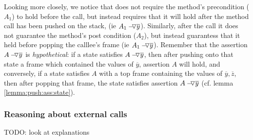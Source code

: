 {

{Looking more closely, we notice  that {} does not require the method's precondition ($A_1$) to hold before the call, but instead requires that it will hold after the method call has been pushed on the stack, (ie $  \PushAS {y}{A_1}$).
Similarly, after the call it does not guarantee the method's post condition ($A_2$), but instead guarantess that it held before popping the calllee's frame (ie $  \PushAS {y}{A_1}$).
Remember that the assertion $\PushAS y A$ is \emph{hypothetical}: if a state satisfies $\PushAS y A$, then after pushing
onto that state a frame which contained the values  of $\overline y$, assertion $A$ will hold, and conversely,   if a state satisfies  $A$ with a top frame containing the  values of $\overline y, \overline z$, then  after popping that frame, the state  satisfies assertion  $\PushAS y A$ (cf.  lemma \ref{lemma:push:ass:state}).




\subsubsection{Reasoning about external calls} 
TODO: look at explanations

}}
